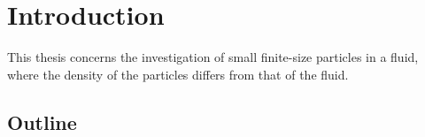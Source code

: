\chapter{Introduction}

This thesis concerns the investigation of small finite-size particles in a fluid, where the density of the 
particles differs from that of the fluid. 

\section{Outline}